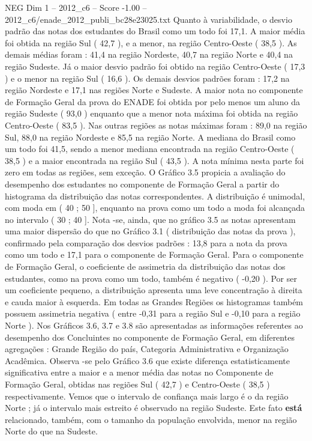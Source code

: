 \begin{textsample}{NEG Dim 1 – 2012\_c6 – Score -1.00 – 2012\_c6/enade\_2012\_publi\_bc28e23025.txt}
Quanto à variabilidade, o desvio padrão das notas dos estudantes do Brasil como um todo foi 17,1.
A maior média foi obtida na região Sul ( 42,7 ), e a menor, na região Centro-Oeste ( 38,5 ).
As demais médias foram : 41,4 na região Nordeste, 40,7 na região Norte e 40,4 na região Sudeste.
Já o maior desvio padrão foi obtido na região Centro-Oeste ( 17,3 ) e o menor na região Sul ( 16,6 ).
Os demais desvios padrões foram : 17,2 na região Nordeste e 17,1 nas regiões Norte e Sudeste.
A maior nota no componente de Formação Geral da prova do ENADE foi obtida por pelo menos um aluno da região Sudeste ( 93,0 ) enquanto que a menor nota máxima foi obtida na região Centro-Oeste ( 83,5 ).
Nas outras regiões as notas máximas foram : 89,0 na região Sul, 88,0 na região Nordeste e 85,5 na região Norte.
A mediana do Brasil como um todo foi 41,5, sendo a menor mediana encontrada na região Centro-Oeste ( 38,5 ) e a maior encontrada na região Sul ( 43,5 ).
A nota mínima nesta parte foi zero em todas as regiões, sem exceção.
O Gráfico 3.5 propicia a avaliação do desempenho dos estudantes no componente de Formação Geral a partir do histograma da distribuição das notas correspondentes.
A distribuição é unimodal, com moda em ( 40 ; 50 ], enquanto na prova como um todo a moda foi alcançada no intervalo ( 30 ; 40 ].
Nota -se, ainda, que no gráfico 3.5 as notas apresentam uma maior dispersão do que no Gráfico 3.1 ( distribuição das notas da prova ), confirmado pela comparação dos desvios padrões : 13,8 para a nota da prova como um todo e 17,1 para o componente de Formação Geral.
Para o componente de Formação Geral, o coeficiente de assimetria da distribuição das notas dos estudantes, como na prova como um todo, também é negativo ( -0,20 ).
Por ser um coeficiente pequeno, a distribuição apresenta uma leve concentração à direita e cauda maior à esquerda.
Em todas as Grandes Regiões os histogramas também possuem assimetria negativa ( entre -0,31 para a região Sul e -0,10 para a região Norte ).
Nos Gráficos 3.6, 3.7 e 3.8 são apresentadas as informações referentes ao desempenho dos Concluintes no componente de Formação Geral, em diferentes agregações : Grande Região do país, Categoria Administrativa e Organização Acadêmica.
Observa -se pelo Gráfico 3.6 que existe diferença estatisticamente significativa entre a maior e a menor média das notas no Componente de Formação Geral, obtidas nas regiões Sul ( 42,7 ) e Centro-Oeste ( 38,5 ) respectivamente.
Vemos que o intervalo de confiança mais largo é o da região Norte ; já o intervalo mais estreito é observado na região Sudeste.
Este fato \textbf{está} relacionado, também, com o tamanho da população envolvida, menor na região Norte do que na Sudeste.

\end{textsample}
